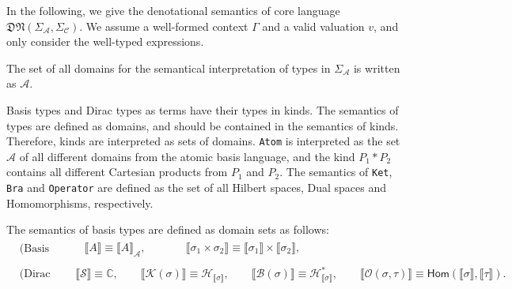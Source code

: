 \documentclass[manuscript, review, timestamp]{acmart}
\newcommand*{\Sc}{\mathcal{S}}
\newcommand*{\K}{\mathcal{K}}
\newcommand*{\B}{\mathcal{B}}
\newcommand*{\Op}{\mathcal{O}}
\newcommand*{\sem}[1]{\llbracket #1 \rrbracket}
\begin{document}
In the following, we give the denotational semantics of core language $\mathfrak{DN}(\Sigma_\mathcal{A}, \Sigma_\mathcal{C})$. We assume a well-formed context $\Gamma$ and a valid valuation $v$, and only consider the well-typed expressions.

\begin{definition}
  The set of all domains for the semantical interpretation of types in $\Sigma_{\mathcal{A}}$ is written as $\mathcal{A}$.
\end{definition}

Basis types and Dirac types as terms have their types in kinds. The semantics of types are defined as domains, and should be contained in the semantics of kinds. Therefore, kinds are interpreted as sets of domains. \texttt{Atom} is interpreted as the set $\mathcal{A}$ of all different domains from the atomic basis language, and the kind $P_1 * P_2$ contains all different Cartesian products from $P_1$ and $P_2$. The semantics of \texttt{Ket}, \texttt{Bra} and \texttt{Operator} are defined as the set of all Hilbert spaces, Dual spaces and Homomorphisms, respectively.


\begin{definition}
  The semantics of basis types are defined as domain sets as follows:
  \begin{align*}
    & \text{(Basis Types)} && \begin{aligned}
      & \sem{A} \equiv \sem{A}_\mathcal{A},
      \qquad
      && \sem{\sigma_1 \times \sigma_2} \equiv \sem{\sigma_1} \times \sem{\sigma_2},
    \end{aligned} \\
    & \text{(Dirac Types)} && \begin{aligned}
      \sem{\Sc} \equiv \mathbb{C},
      \qquad
      \sem{\K(\sigma)} \equiv \mathcal{H}_{\sem{\sigma}}, 
      \qquad 
      \sem{\B(\sigma)} \equiv \mathcal{H}^*_{\sem{\sigma}},
      \qquad
      \sem{\Op(\sigma, \tau)} \equiv \textsf{Hom}(\sem{\sigma}, \sem{\tau}).
    \end{aligned}
  \end{align*}
\end{definition}
\end{document}
